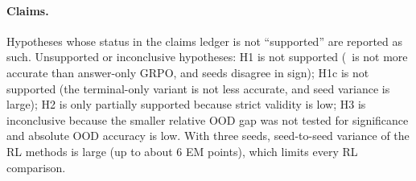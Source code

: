 \paragraph{Claims.}
Hypotheses whose status in the claims ledger is not ``supported'' are reported as such.
Unsupported or inconclusive hypotheses: H1 is not supported (\hop\ is not more accurate than answer-only GRPO, and seeds disagree in sign); H1c is not supported (the terminal-only variant is not less accurate, and seed variance is large); H2 is only partially supported because strict validity is low; H3 is inconclusive because the smaller relative OOD gap was not tested for significance and absolute OOD accuracy is low. With three seeds, seed-to-seed variance of the RL methods is large (up to about 6 EM points), which limits every RL comparison.

